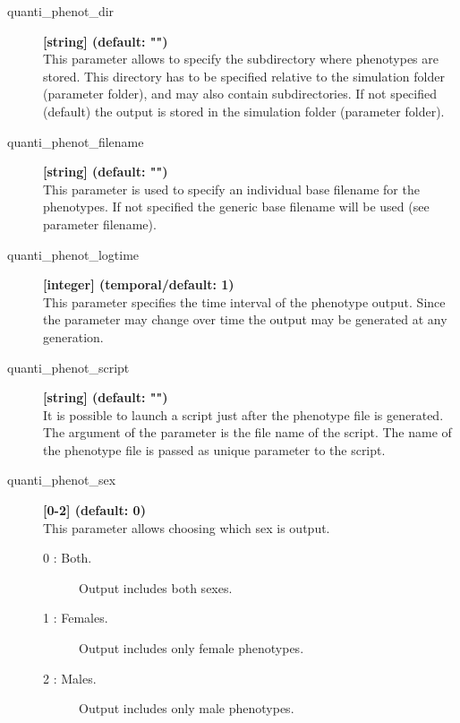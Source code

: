 \documentclass[letterpaper,12pt,oneside]{book}
\begin{document}
\begin{description}
\item[quanti\_phenot\_dir] \textbf{[string] (default: "")}\\
This parameter allows to specify the subdirectory where phenotypes are stored. This directory has to be specified relative to the simulation folder (parameter \textsf{folder}), and may also contain subdirectories. If not specified (default) the output is stored in the simulation folder (parameter \textsf{folder}).

\item[quanti\_phenot\_filename] \textbf{[string] (default: "")}\\
This parameter is used to specify an individual base filename for the phenotypes. If not specified the generic base filename will be used (see parameter \textsf{filename}).

\item[quanti\_phenot\_logtime] \textbf{[integer] (temporal/default: 1)}\\
This parameter specifies the time interval of the phenotype output. Since the parameter may change over time the output may be generated at any generation.

\item[quanti\_phenot\_script] \textbf{[string] (default: "")}\\
It is possible to launch a script just after the phenotype file is generated. The argument of the parameter is the file name of the script. The name of the phenotype file is passed as unique parameter to the script. 

\item[quanti\_phenot\_sex] \textbf{[0-2] (default: 0)}\\
This parameter allows choosing which sex is output. 
\begin{description}
\item [0 : Both.] Output includes both sexes.
\item [1 : Females.] Output includes only female phenotypes.
\item [2 : Males.] Output includes only male phenotypes.
\end{description}
\end{description}
\end{document}
